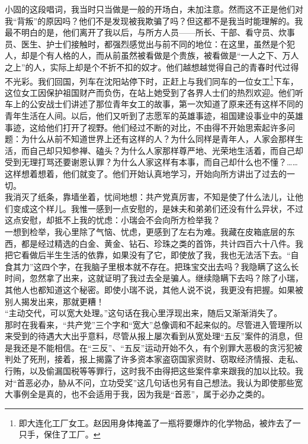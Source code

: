 小固的这段唱词，我当时只当做是一般的开场白，未加注意。然而这不正是他们对我“背叛”的原因吗？他们不是发现被我欺骗了吗？但这都不是我当时能理解的。我最不明白的是，他们离开了我以后，与所方人员——所长、干部、看守员、炊事员、医生、护士们接触时，都强烈感觉出与前不同的地位：在这里，虽然是个犯人，却是个有人格的人，而从前虽然被看做是个贵族，被看做是“一人之下、万人之上”的人，实际上却是个不折不扣的奴才。他们越想越觉得自己的青春时代过得不光彩。我们回国，列车在沈阳站停下时，正赶上与我们同车的一位女工\footnote{即大连化工厂女工。赵因用身体掩盖了一瓶将要爆炸的化学物品，被炸去了一只手，保住了工厂。}下车，这位女工因保护祖国财产而负伤，在站上她受到了各界人士们的热烈欢迎。他们听车上的公安战士们讲述了那位青年女工的故事，第一次知道了原来还有这样不同的青年生活在人间。以后，他们又听到了志愿军的英雄事迹，祖国建设事业中的英雄事迹，这给他们打开了视野。他们经过不断的对比，不由得不开始思索起许多问题：为什么从前不知道世界上还有这样的人？为什么同样是青年人，人家会那样生活，而自己却只知参禅、磕头？为什么人家那样尊严地、光荣地生活着，而自己却受到无理打骂还要谢恩认罪？为什么人家这样有本事，而自己却什么也不懂？……\\

这样想着想着，他们就变了。他们开始认真地学习，开始向所方讲出了过去的一切。\\

我消灭了纸条，靠墙坐着，忧间地想：共产党真厉害，不知是使了什么法儿，让他们变成这个样儿。我惟一感到一点安慰的，是妹夫和弟弟们还没有什么异状，不过这点安慰，却抵不上我的忧虑：小瑞会不会向所方检举我？\\

一想到检举，我心里除了气恼、忧虑，更感到了左右为难。我藏在皮箱底层的东西，都是经过精选的白金、黄金、钻石、珍珠之类的首饰，共计四百六十八件。我把它看做后半生生活的依靠，如果没有了它，即使放了我，我也无法活下去。“自食其力”这四个字，在我脑子里根本就不存在。把珠宝交出去吗？我隐瞒了这么长时间，忽然拿了出来，这就证明了我过去全是骗人。继续隐瞒下去吗？除了小瑞，其他人也都知道这个秘密。即使小瑞不说，其他人说不说，我更没有把握。如果被别人揭发出来，那就更糟！\\

“主动交代，可以宽大处理。”这句话在我心里浮现出来，随后又渐渐消失了。\\

那时在我看来，“共产党”三个字和“宽大”总像调和不起来似的。尽管进入管理所以来受到的待遇大大出乎意料，尽管从报上屡次看到从宽处理“五反”案件的消息，但是我还是不能相信。在“三反”、“五反”运动开始不久，有个别罪大恶极的贪污犯被判处了死刑，接着，报上揭露了许多资本家盗窃国家资财、窃取经济情报、走私、行贿，以及偷漏国税等等罪行，这时我不由得把这些案件拿来跟我的加以比较。我对“首恶必办，胁从不问，立功受奖”这几句话也另有自己想法。我认为即使那些宽大事例全是真的，也不会适用于我，因为我是“首恶”，属于必办之类的。\\

